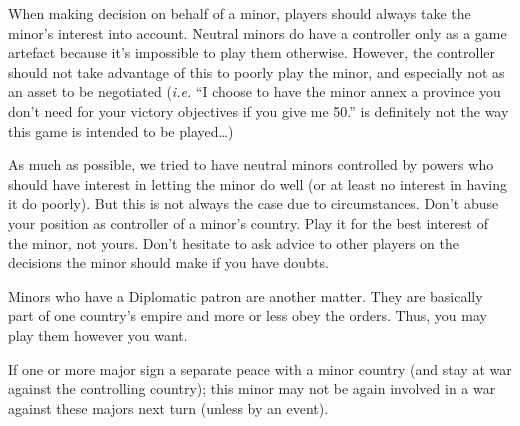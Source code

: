 \begin{designnote}
  When making decision on behalf of a minor, players should always take the
  minor's interest into account. Neutral minors do have a controller only as a
  game artefact because it's impossible to play them otherwise. However, the
  controller should not take advantage of this to poorly play the minor, and
  especially not as an asset to be negotiated (\emph{i.e.} ``I choose to have
  the minor annex a province you don't need for your victory objectives if you
  give me 50\ducats.'' is definitely not the way this game is intended to be
  played\ldots)

  As much as possible, we tried to have neutral minors controlled by powers
  who should have interest in letting the minor do well (or at least no
  interest in having it do poorly). But this is not always the case due to
  circumstances. Don't abuse your position as controller of a minor's
  country. Play it for the best interest of the minor, not yours. Don't
  hesitate to ask advice to other players on the decisions the minor should
  make if you have doubts.

  Minors who have a Diplomatic patron are another matter. They are basically
  part of one country's empire and more or less obey the orders. Thus, you may
  play them however you want.
\end{designnote}

If one or more major sign a separate peace with a minor country (and stay at
war against the controlling country); this minor may not be again involved in
a war against these majors next turn (unless by an event).



